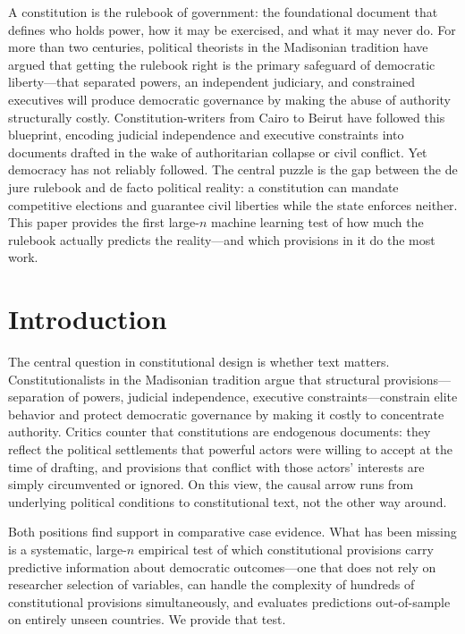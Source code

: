 \documentclass[9pt,twoside]{pnas-new}
\begin{document}
\Firstpage

A constitution is the rulebook of government: the foundational document that defines who holds power, how it may be exercised, and what it may never do. For more than two centuries, political theorists in the Madisonian tradition have argued that getting the rulebook right is the primary safeguard of democratic liberty---that separated powers, an independent judiciary, and constrained executives will produce democratic governance by making the abuse of authority structurally costly. Constitution-writers from Cairo to Beirut have followed this blueprint, encoding judicial independence and executive constraints into documents drafted in the wake of authoritarian collapse or civil conflict. Yet democracy has not reliably followed. The central puzzle is the gap between the de jure rulebook and de facto political reality: a constitution can mandate competitive elections and guarantee civil liberties while the state enforces neither. This paper provides the first large-$n$ machine learning test of how much the rulebook actually predicts the reality---and which provisions in it do the most work.

\Endparasplit

\section*{Introduction}

The central question in constitutional design is whether text matters. Constitutionalists in the Madisonian tradition argue that structural provisions---separation of powers, judicial independence, executive constraints---constrain elite behavior and protect democratic governance by making it costly to concentrate authority. Critics counter that constitutions are endogenous documents: they reflect the political settlements that powerful actors were willing to accept at the time of drafting, and provisions that conflict with those actors' interests are simply circumvented or ignored. On this view, the causal arrow runs from underlying political conditions to constitutional text, not the other way around.

Both positions find support in comparative case evidence. What has been missing is a systematic, large-$n$ empirical test of which constitutional provisions carry predictive information about democratic outcomes---one that does not rely on researcher selection of variables, can handle the complexity of hundreds of constitutional provisions simultaneously, and evaluates predictions out-of-sample on entirely unseen countries. We provide that test.
\end{document}
